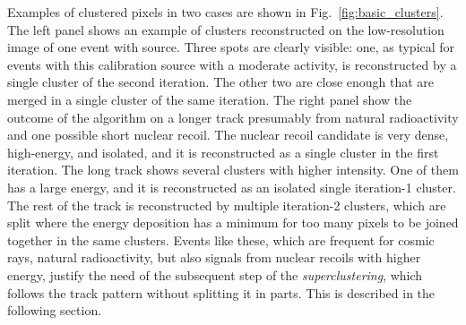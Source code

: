 Examples of clustered pixels in two cases are shown in
Fig.~\ref{fig:basic_clusters}. The left panel shows an example of
clusters reconstructed on the low-resolution image of one event
with \fe source. Three spots are clearly visible: one, as typical for
events with this calibration source with a moderate activity, is
reconstructed by a single cluster of the second iteration. The other
two are close enough that are merged in a single cluster of the same
iteration. The right panel show the outcome of the \idbscan algorithm
on a longer track presumably from natural radioactivity and one
possible short nuclear recoil.  The nuclear recoil candidate is very
dense, high-energy, and isolated, and it is reconstructed as a single
cluster in the first iteration. The long track shows several clusters
with higher intensity. One of them has a large energy, and it is
reconstructed as an isolated single iteration-1 cluster. The rest of
the track is reconstructed by multiple iteration-2 clusters, which are
split where the energy deposition has a minimum for too many pixels to
be joined together in the same clusters. Events like these, which are
frequent for cosmic rays, natural radioactivity, but also signals from
nuclear recoils with higher energy, justify the need of the subsequent
step of the \textit{superclustering}, which follows the track pattern
without splitting it in parts. This is described in the following
section.
%
